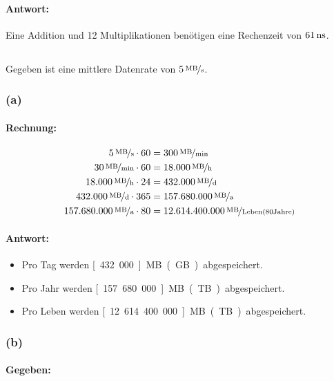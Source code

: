 \documentclass[11pt,a4paper]{article}
\begin{document}
\paragraph{Antwort:}
Eine Addition und 12 Multiplikationen benötigen eine Rechenzeit von $\unit[61]{ns}$.

\subsection{} %
Gegeben ist eine mittlere Datenrate von $\unitfrac[5]{MB}{s}$.


\subsubsection{(a)} %
\paragraph{Rechnung:}

\begin{align}
\unitfrac[5]{MB}{s}\cdot60 &= \unitfrac[300]{MB}{min}\\
\unitfrac[30]{MB}{min}\cdot60 &= \unitfrac[18.000]{MB}{h}\\
\unitfrac[18.000]{MB}{h}\cdot24 &=  \unitfrac[432.000]{MB}{d}\\
\unitfrac[432.000]{MB}{d}\cdot365 &= \unitfrac[157.680.000]{MB}{a}\\
\unitfrac[157.680.000]{MB}{a}\cdot80 &= \unitfrac[12.614.400.000]{MB}{Leben(80 Jahre)}
\end{align}

\paragraph{Antwort:}
\begin{itemize}
  \item Pro Tag werden \unit[432.000]{MB} (\unit[430]{GB}) abgespeichert.
  \item Pro Jahr werden \unit[157.680.000]{MB} (\unit[157,68]{TB}) abgespeichert.
  \item Pro Leben werden \unit[12.614.400.000]{MB} (\unit[12614,4]{TB}) abgespeichert.
\end{itemize}


\subsubsection{(b)} %
\paragraph{Gegeben:}
\end{document}
